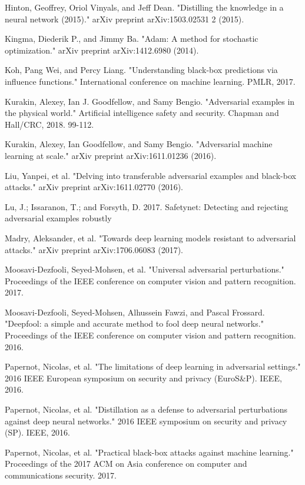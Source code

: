 \begin{thebibliography}{9}
	\bibitem{}
	Hinton, Geoffrey, Oriol Vinyals, and Jeff Dean. "Distilling the knowledge in a neural network (2015)." arXiv preprint arXiv:1503.02531 2 (2015).
	
	\bibitem{}
	Kingma, Diederik P., and Jimmy Ba. "Adam: A method for stochastic optimization." arXiv preprint arXiv:1412.6980 (2014).
	
	\bibitem{}
	Koh, Pang Wei, and Percy Liang. "Understanding black-box predictions via influence functions." International conference on machine learning. PMLR, 2017.
	
	\bibitem{}
	Kurakin, Alexey, Ian J. Goodfellow, and Samy Bengio. "Adversarial examples in the physical world." Artificial intelligence safety and security. Chapman and Hall/CRC, 2018. 99-112.
	
	\bibitem{}
	Kurakin, Alexey, Ian Goodfellow, and Samy Bengio. "Adversarial machine learning at scale." arXiv preprint arXiv:1611.01236 (2016).
	
	\bibitem{}
	Liu, Yanpei, et al. "Delving into transferable adversarial examples and black-box attacks." arXiv preprint arXiv:1611.02770 (2016).
	
	\bibitem{}
	Lu, J.; Issaranon, T.; and Forsyth, D. 2017. Safetynet: Detecting and rejecting adversarial examples robustly
	
	\bibitem{}
	Madry, Aleksander, et al. "Towards deep learning models resistant to adversarial attacks." arXiv preprint arXiv:1706.06083 (2017).
	
	\bibitem{}
	Moosavi-Dezfooli, Seyed-Mohsen, et al. "Universal adversarial perturbations." Proceedings of the IEEE conference on computer vision and pattern recognition. 2017.
	
	\bibitem{}
	Moosavi-Dezfooli, Seyed-Mohsen, Alhussein Fawzi, and Pascal Frossard. "Deepfool: a simple and accurate method to fool deep neural networks." Proceedings of the IEEE conference on computer vision and pattern recognition. 2016.
	
	\bibitem{}
	Papernot, Nicolas, et al. "The limitations of deep learning in adversarial settings." 2016 IEEE European symposium on security and privacy (EuroS\&P). IEEE, 2016.
	
	\bibitem{}
	Papernot, Nicolas, et al. "Distillation as a defense to adversarial perturbations against deep neural networks." 2016 IEEE symposium on security and privacy (SP). IEEE, 2016.
	
	\bibitem{}
	Papernot, Nicolas, et al. "Practical black-box attacks against machine learning." Proceedings of the 2017 ACM on Asia conference on computer and communications security. 2017.
	

\end{thebibliography}
